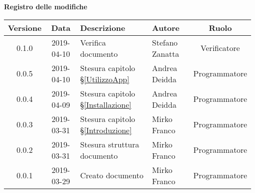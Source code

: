 	\begin{center}
		\textbf{Registro delle modifiche}
	\end{center}
	\begin{center}
		\begin{tabularx}{\textwidth}{|c|c|X|X|c|}
			\hline
			\textbf{Versione} & \textbf{Data} & \textbf{Descrizione} & \textbf{Autore} & \textbf{Ruolo} \\
			\hline
			0.1.0 & 2019-04-10 & Verifica documento & Stefano Zanatta & Verificatore \\
			\hline
			0.0.5 & 2019-04-10 & Stesura capitolo \S\ref{UtilizzoApp} & Andrea Deidda & Programmatore \\
			\hline
			0.0.4 & 2019-04-09 & Stesura capitolo \S\ref{Installazione} & Andrea Deidda & Programmatore \\
			\hline
			0.0.3 & 2019-03-31 & Stesura capitolo \S\ref{Introduzione} & Mirko Franco & Programmatore \\
			\hline
			0.0.2 & 2019-03-31 & Stesura struttura documento & Mirko Franco & Programmatore \\
			\hline
			0.0.1 & 2019-03-29 & Creato documento & Mirko Franco & Programmatore \\
			\hline
		\end{tabularx}
	\end{center}
\newpage